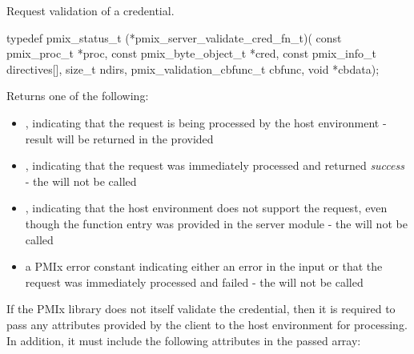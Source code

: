 \summary

Request validation of a credential.

\format

\cspecificstart
\begin{codepar}
typedef pmix_status_t (*pmix_server_validate_cred_fn_t)(
                             const pmix_proc_t *proc,
                             const pmix_byte_object_t *cred,
                             const pmix_info_t directives[],
                             size_t ndirs,
                             pmix_validation_cbfunc_t cbfunc,
                             void *cbdata);
\end{codepar}
\cspecificend

\begin{arglist}
\end{arglist}

Returns one of the following:

\begin{itemize}
    \item {}, indicating that the request is being processed by the host environment - result will be returned in the provided 
    \item {}, indicating that the request was immediately processed and returned \textit{success} - the  will not be called
    \item {}, indicating that the host environment does not support the request, even though the function entry was provided in the server module - the  will not be called
    \item a PMIx error constant indicating either an error in the input or that the request was immediately processed and failed - the  will not be called
\end{itemize}

\reqattrstart
If the \ac{PMIx} library does not itself validate the credential, then it is required to pass any attributes provided by the client to the host environment for processing. In addition, it must include the following attributes in the passed  array:


